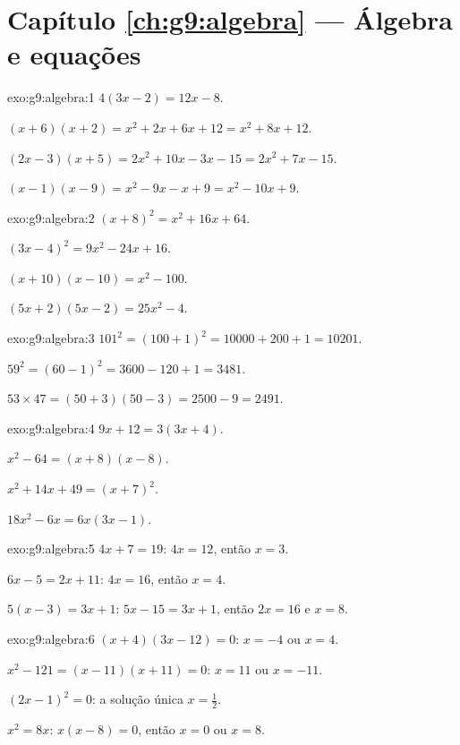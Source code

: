 \section*{Capítulo \ref{ch:g9:algebra} --- Álgebra e equações}

\begin{solution}{exo:g9:algebra:1}
$4(3x - 2) = 12x - 8$.

$(x+6)(x+2) = x^2 + 2x + 6x + 12 = x^2 + 8x + 12$.

$(2x-3)(x+5) = 2x^2 + 10x - 3x - 15 = 2x^2 + 7x - 15$.

$(x-1)(x-9) = x^2 - 9x - x + 9 = x^2 - 10x + 9$.
\end{solution}

\begin{solution}{exo:g9:algebra:2}
$(x+8)^2 = x^2 + 16x + 64$.

$(3x-4)^2 = 9x^2 - 24x + 16$.

$(x+10)(x-10) = x^2 - 100$.

$(5x+2)(5x-2) = 25x^2 - 4$.
\end{solution}

\begin{solution}{exo:g9:algebra:3}
$101^2 = (100+1)^2 = 10000 + 200 + 1 = 10201$.

$59^2 = (60-1)^2 = 3600 - 120 + 1 = 3481$.

$53 \times 47 = (50+3)(50-3) = 2500 - 9 = 2491$.
\end{solution}

\begin{solution}{exo:g9:algebra:4}
$9x + 12 = 3(3x + 4)$.

$x^2 - 64 = (x+8)(x-8)$.

$x^2 + 14x + 49 = (x+7)^2$.

$18x^2 - 6x = 6x(3x - 1)$.
\end{solution}

\begin{solution}{exo:g9:algebra:5}
$4x + 7 = 19$: $4x = 12$, então $x = 3$.

$6x - 5 = 2x + 11$: $4x = 16$, então $x = 4$.

$5(x-3) = 3x + 1$: $5x - 15 = 3x + 1$, então $2x = 16$ e $x = 8$.
\end{solution}

\begin{solution}{exo:g9:algebra:6}
$(x+4)(3x-12) = 0$: $x = -4$ ou $x = 4$.

$x^2 - 121 = (x-11)(x+11) = 0$: $x = 11$ ou $x = -11$.

$(2x-1)^2 = 0$: a solução única $x = \frac12$.

$x^2 = 8x$: $x(x - 8) = 0$, então $x = 0$ ou $x = 8$.
\end{solution}

